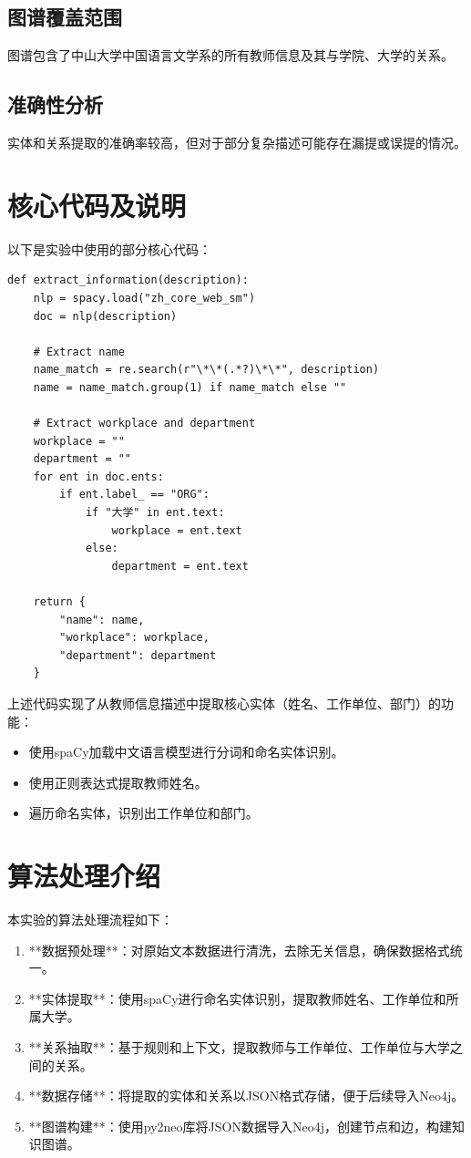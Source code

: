 \subsection{图谱覆盖范围}
图谱包含了中山大学中国语言文学系的所有教师信息及其与学院、大学的关系。

\subsection{准确性分析}
实体和关系提取的准确率较高，但对于部分复杂描述可能存在漏提或误提的情况。


\section{核心代码及说明}
以下是实验中使用的部分核心代码：
\begin{lstlisting}[style=cleanpython]
def extract_information(description):
    nlp = spacy.load("zh_core_web_sm")
    doc = nlp(description)

    # Extract name
    name_match = re.search(r"\*\*(.*?)\*\*", description)
    name = name_match.group(1) if name_match else ""

    # Extract workplace and department
    workplace = ""
    department = ""
    for ent in doc.ents:
        if ent.label_ == "ORG":
            if "大学" in ent.text:
                workplace = ent.text
            else:
                department = ent.text

    return {
        "name": name,
        "workplace": workplace,
        "department": department
    }
\end{lstlisting}

上述代码实现了从教师信息描述中提取核心实体（姓名、工作单位、部门）的功能：
\begin{itemize}
    \item 使用spaCy加载中文语言模型进行分词和命名实体识别。
    \item 使用正则表达式提取教师姓名。
    \item 遍历命名实体，识别出工作单位和部门。
\end{itemize}

\section{算法处理介绍}
本实验的算法处理流程如下：
\begin{enumerate}
    \item **数据预处理**：对原始文本数据进行清洗，去除无关信息，确保数据格式统一。
    \item **实体提取**：使用spaCy进行命名实体识别，提取教师姓名、工作单位和所属大学。
    \item **关系抽取**：基于规则和上下文，提取教师与工作单位、工作单位与大学之间的关系。
    \item **数据存储**：将提取的实体和关系以JSON格式存储，便于后续导入Neo4j。
    \item **图谱构建**：使用py2neo库将JSON数据导入Neo4j，创建节点和边，构建知识图谱。
\end{enumerate}

